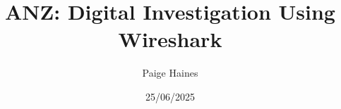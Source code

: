 \documentclass[11pt,a4paper]{style}
\title{ANZ: Digital Investigation Using Wireshark}
\author{Paige Haines}
\date{25/06/2025}
\renewcommand{\baselinestretch}{2.0}
\begin{document}
\maketitle

\newpage
\thispagestyle{plain}

\newpage
\begin{onehalfspacing}
	\tableofcontents
\end{onehalfspacing}
\setlength{\parskip}{1em}

\renewcommand{\baselinestretch}{2.0}

\newpage
{}
\setcounter{page}{1}
\onehalfspacing






\newpage
\onehalfspacing%

\end{document}
